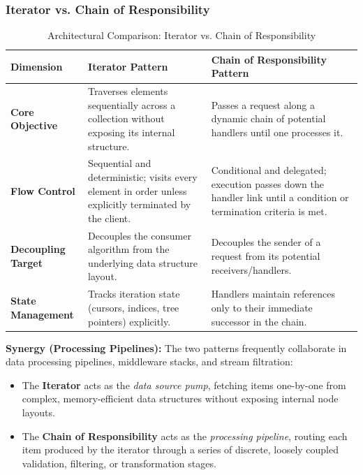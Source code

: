 \subsubsection{Iterator vs. Chain of Responsibility}

\begin{table}[htbp]
\centering
\caption{Architectural Comparison: Iterator vs. Chain of Responsibility}
\begin{tabular}{@{}p{3.5cm} p{5.5cm} p{5.5cm}@{}}
\toprule
\textbf{Dimension} & \textbf{Iterator Pattern} & \textbf{Chain of Responsibility Pattern} \\ \midrule
\textbf{Core Objective} & Traverses elements sequentially across a collection without exposing its internal structure. & Passes a request along a dynamic chain of potential handlers until one processes it. \\ \midrule
\textbf{Flow Control} & Sequential and deterministic; visits every element in order unless explicitly terminated by the client. & Conditional and delegated; execution passes down the handler link until a condition or termination criteria is met. \\ \midrule
\textbf{Decoupling Target} & Decouples the consumer algorithm from the underlying data structure layout. & Decouples the sender of a request from its potential receivers/handlers. \\ \midrule
\textbf{State Management} & Tracks iteration state (cursors, indices, tree pointers) explicitly. & Handlers maintain references only to their immediate successor in the chain. \\ \bottomrule
\end{tabular}
\end{table}

\noindent \textbf{Synergy (Processing Pipelines):}
The two patterns frequently collaborate in data processing pipelines, middleware stacks, and stream filtration:
\begin{itemize}
    \item The \textbf{Iterator} acts as the \textit{data source pump}, fetching items one-by-one from complex, memory-efficient data structures without exposing internal node layouts.
    \item The \textbf{Chain of Responsibility} acts as the \textit{processing pipeline}, routing each item produced by the iterator through a series of discrete, loosely coupled validation, filtering, or transformation stages.
\end{itemize}

